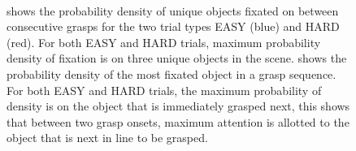 \begin{figure}[h]
    \centering
    \\
    \caption[]{\protect{} shows the probability density of unique objects fixated on between consecutive grasps for the two trial types EASY (blue) and HARD (red). For both EASY and HARD trials, maximum probability density of fixation is on three unique objects in the scene. \protect{} shows the probability density of the most fixated object in a grasp sequence. For both EASY and HARD trials, the maximum probability of density is on the object that is immediately grasped next, this shows that between two grasp onsets, maximum attention is allotted to the object that is next in line to be grasped. 
}
\end{figure}
